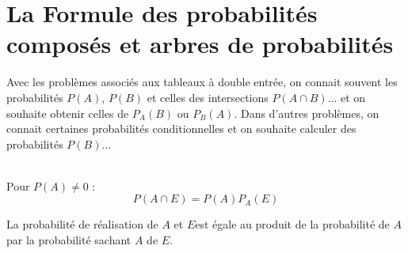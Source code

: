 \documentclass[main.tex]{subfiles}
\begin{document}
\newpage 
{}  
\pagestyle{scrheadings} %

\onehalfspacing  
\section{La Formule des probabilités composés  et arbres de probabilités} 

Avec les problèmes associés aux tableaux à double entrée, on connait souvent les probabilités $P(A)$, $P(B)$ et celles des intersections $P(A\cap B)$... et on souhaite obtenir celles de $P_A(B)$ ou $P_B(A)$. Dans d'autres problèmes, on connait certaines probabilités conditionnelles et on souhaite calculer des probabilités $P(B)$...
\begin{proposition} \hfill \\
	Pour $P\left(A\right) \neq 0$  :
	\setlength{\abovedisplayskip}{3pt}
	\setlength{\belowdisplayskip}{3pt}
	$$
	P\left(A \cap E\right) = P\left(A\right)   P_A \left(E\right) 
	$$
\end{proposition}
\begin{remark} La probabilité de réalisation de \og $A$ et $E$\fg est égale au produit de la probabilité de $A$ par la probabilité sachant $A$ de $E$.
\end{remark} 
\end{document}
